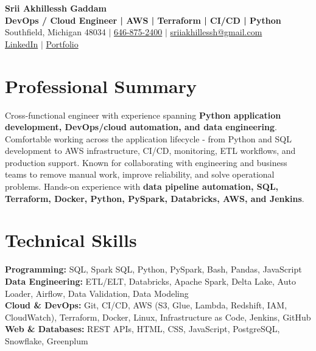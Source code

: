 \documentclass[letterpaper,10pt]{article}
\begin{document}
\fontsize{9.35pt}{10.45pt}\selectfont

\begin{center}
    {\LARGE \textbf{Srii Akhillessh Gaddam}} \\[-1pt]
    \textbf{DevOps / Cloud Engineer | AWS | Terraform | CI/CD | Python} \\[2pt]
    Southfield, Michigan 48034 $|$
    \href{tel:6468752400}{646-875-2400} $|$
    \href{mailto:sriiakhillessh@gmail.com}{sriiakhillessh@gmail.com} \\[1pt]
    \href{https://www.linkedin.com/in/srii-akhiilessh-gaddam-b48668191/}{LinkedIn} $|$
    \href{https://sriiakhillesshg.github.io/portfolio/}{Portfolio}
\end{center}
\vspace{-8pt}

\section{Professional Summary}
\small{Cross-functional engineer with experience spanning \textbf{Python application development, DevOps/cloud automation, and data engineering}. Comfortable working across the application lifecycle - from Python and SQL development to AWS infrastructure, CI/CD, monitoring, ETL workflows, and production support. Known for collaborating with engineering and business teams to remove manual work, improve reliability, and solve operational problems. Hands-on experience with \textbf{data pipeline automation, SQL, Terraform, Docker, Python, PySpark, Databricks, AWS, and Jenkins}.}

\section{Technical Skills}
\small{
\textbf{Programming:} SQL, Spark SQL, Python, PySpark, Bash, Pandas, JavaScript \\
\textbf{Data Engineering:} ETL/ELT, Databricks, Apache Spark, Delta Lake, Auto Loader, Airflow, Data Validation, Data Modeling \\
\textbf{Cloud \& DevOps:} Git, CI/CD, AWS (S3, Glue, Lambda, Redshift, IAM, CloudWatch), Terraform, Docker, Linux, Infrastructure as Code, Jenkins, GitHub \\
\textbf{Web \& Databases:} REST APIs, HTML, CSS, JavaScript, PostgreSQL, Snowflake, Greenplum
}
\end{document}
